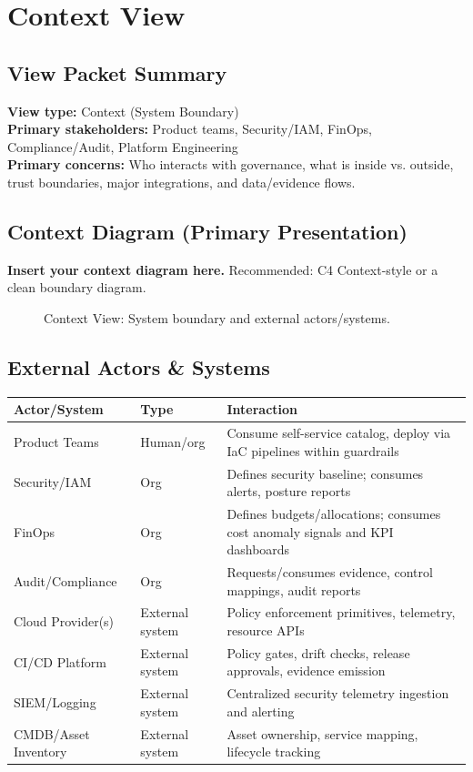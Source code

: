 \documentclass[11pt]{report}
\begin{document}
\clearpage

\chapter{Context View}
\section{View Packet Summary}
\begin{viewbox}
\textbf{View type:} Context (System Boundary)\\
\textbf{Primary stakeholders:} Product teams, Security/IAM, FinOps, Compliance/Audit, Platform Engineering\\
\textbf{Primary concerns:} Who interacts with governance, what is inside vs. outside, trust boundaries,
major integrations, and data/evidence flows.
\end{viewbox}

\section{Context Diagram (Primary Presentation)}
\textbf{Insert your context diagram here.} Recommended: C4 Context-style or a clean boundary diagram.

\begin{figure}[htbp]
  \centering
  \caption{Context View: System boundary and external actors/systems.}
\end{figure}

\section{External Actors \& Systems}
\begin{tabularx}{\textwidth}{@{}l l >{\raggedright\arraybackslash}X@{}}
\toprule
\textbf{Actor/System} & \textbf{Type} & \textbf{Interaction} \\
\midrule
Product Teams & Human/org & Consume self-service catalog, deploy via IaC pipelines within guardrails \\
Security/IAM & Org & Defines security baseline; consumes alerts, posture reports \\
FinOps & Org & Defines budgets/allocations; consumes cost anomaly signals and KPI dashboards \\
Audit/Compliance & Org & Requests/consumes evidence, control mappings, audit reports \\
Cloud Provider(s) & External system & Policy enforcement primitives, telemetry, resource APIs \\
CI/CD Platform & External system & Policy gates, drift checks, release approvals, evidence emission \\
SIEM/Logging & External system & Centralized security telemetry ingestion and alerting \\
CMDB/Asset Inventory & External system & Asset ownership, service mapping, lifecycle tracking \\
\bottomrule
\end{tabularx}
\end{document}
